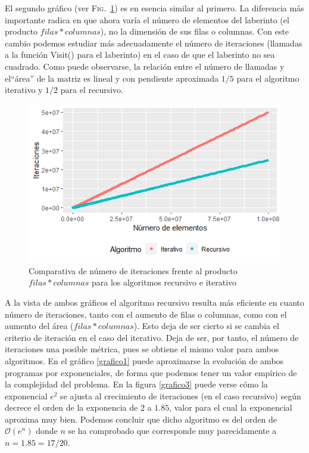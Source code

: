 \documentclass[12pt,a4paper]{article}
\begin{document}
El segundo gráfico (ver \textsc{Fig.}~\ref{grafico2}) es en esencia similar al primero. La diferencia más importante radica en que ahora varía el número de elementos del laberinto (el producto $filas*columnas$), no la dimensión de sus filas o columnas. Con este cambio podemos estudiar más adecuadamente el número de iteraciones (llamadas a la función \textsf{Visit()} para el laberinto) en el caso de que el laberinto no sea cuadrado. Como puede observarse, la relación entre el número de llamadas y el``área'' de la matriz es lineal y con pendiente aproximada $1/5$ para el algoritmo iterativo y $1/2$ para el recursivo.

\begin{figure}[h]
	\centering
	\includegraphics[scale=0.9]{fotos/Iteraciones_vs_numElem.png}
	\caption{Comparativa de número de iteraciones frente al producto $filas*columnas$ para los algoritmos recursivo e iterativo}
	\label{grafico2}
\end{figure}
\vspace{0.2cm}

A la vista de ambos gráficos el algoritmo recursivo resulta más eficiente en cuanto número de iteraciones, tanto con el aumento de filas o columnas, como con el aumento del área ($filas*columnas$). Esto deja de ser cierto si se cambia el criterio de iteración en el caso del iterativo. Deja de ser, por tanto, el número de iteraciones una posible métrica, pues se obtiene el mismo valor para ambos algoritmos. En el gráfico \ref{grafico1} puede aproximarse la evolución de ambos programas por exponenciales, de forma que podemos tener un valor empírico de la complejidad del problema.
En la figura \ref{grafico3} puede verse cómo la exponencial $e^{2}$ se ajusta al crecimiento de iteraciones (en el caso recursivo) según decrece el orden de la exponencia de $2$ a $1.85$, valor para el cual la exponencial aproxima muy bien. Podemos concluir que dicho algoritmo es del orden de $\mathcal{O}(e^{n})$ donde $n$ se ha comprobado que corresponde muy parecidamente a $n=1.85=17/20$.
\end{document}
